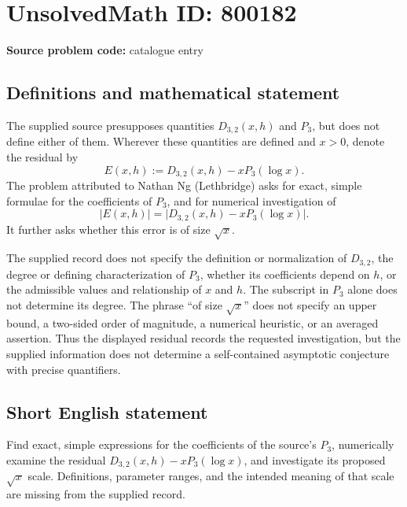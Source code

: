 \documentclass[11pt]{article}
\begin{document}
\section*{UnsolvedMath ID: 800182}
\textbf{Source problem code:} catalogue entry
\subsection{Definitions and mathematical statement}
The supplied source presupposes quantities \(D_{3,2}(x,h)\) and \(P_3\), but does not define either of them. Wherever these quantities are defined and \(x>0\), denote the residual by
\[
E(x,h):=D_{3,2}(x,h)-xP_3(\log x).
\]
The problem attributed to Nathan Ng (Lethbridge) asks for exact, simple formulae for the coefficients of \(P_3\), and for numerical investigation of
\[
|E(x,h)|=\bigl|D_{3,2}(x,h)-xP_3(\log x)\bigr|.
\]
It further asks whether this error is of size \(\sqrt{x}\).

The supplied record does not specify the definition or normalization of \(D_{3,2}\), the degree or defining characterization of \(P_3\), whether its coefficients depend on \(h\), or the admissible values and relationship of \(x\) and \(h\). The subscript in \(P_3\) alone does not determine its degree. The phrase ``of size \(\sqrt{x}\)'' does not specify an upper bound, a two-sided order of magnitude, a numerical heuristic, or an averaged assertion. Thus the displayed residual records the requested investigation, but the supplied information does not determine a self-contained asymptotic conjecture with precise quantifiers.
\subsection{Short English statement}
Find exact, simple expressions for the coefficients of the source's \(P_3\), numerically examine the residual \(D_{3,2}(x,h)-xP_3(\log x)\), and investigate its proposed \(\sqrt{x}\) scale. Definitions, parameter ranges, and the intended meaning of that scale are missing from the supplied record.
\end{document}
